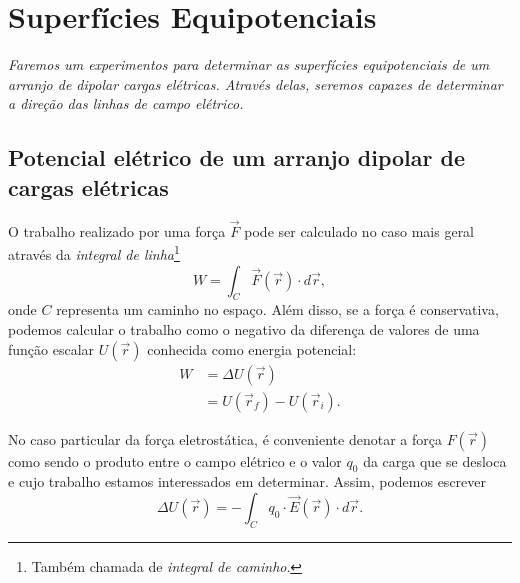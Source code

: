 \chapter{Superfícies Equipotenciais} %
\label{Chap:SupEquip}        %

\begin{fullwidth}\it
	Faremos um experimentos para determinar as superfícies equipotenciais de um arranjo de dipolar cargas elétricas. Através delas, seremos capazes de determinar a direção das linhas de campo elétrico.
\end{fullwidth}

\section{Potencial elétrico de um arranjo dipolar de cargas elétricas}

O trabalho realizado por uma força $\vec{F}$ pode ser calculado no caso mais geral através da \emph{integral de linha}\footnote{Também chamada de \emph{integral de caminho}.}
\begin{equation}
    W = \int_C \vec{F}(\vec{r}) \cdot d\vec{r},
\end{equation}
%
onde $C$ representa um caminho no espaço. Além disso, se a força é conservativa, podemos calcular o trabalho como o negativo da diferença de valores de uma função escalar $U(\vec{r})$ conhecida como energia potencial:
\begin{align}
    W &= \Delta U(\vec{r}) \\
    &= U(\vec{r}_f) - U(\vec{r}_i).
\end{align}

No caso particular da força eletrostática, é conveniente denotar a força $F(\vec{r})$ como sendo o produto entre o campo elétrico e o valor $q_0$ da carga que se desloca e cujo trabalho estamos interessados em determinar. Assim, podemos escrever
\begin{equation}\label{Eq:EnergiaPotencialParaDeslEmCampoEletrico}
    \Delta U(\vec{r}) = - \int_C q_0 \cdot \vec{E}(\vec{r}) \cdot d\vec{r}.
\end{equation}

